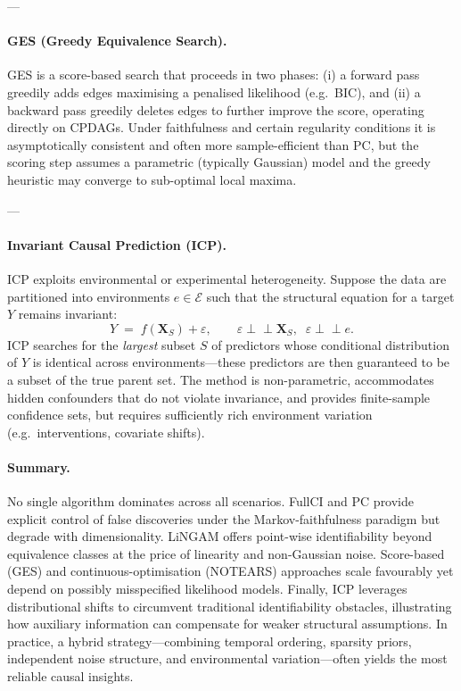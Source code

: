 \documentclass[14pt]{extarticle}
\begin{document}
	---
	
	\paragraph*{GES (Greedy Equivalence Search).}  
	GES is a score-based search that proceeds in two phases: (i) a forward pass greedily adds edges maximising a penalised likelihood (e.g.\ BIC), and (ii) a backward pass greedily deletes edges to further improve the score, operating directly on CPDAGs.  Under faithfulness and certain regularity conditions it is asymptotically consistent and often more sample-efficient than PC, but the scoring step assumes a parametric (typically Gaussian) model and the greedy heuristic may converge to sub-optimal local maxima.  
	
	---
	
	\paragraph*{Invariant Causal Prediction (ICP).}  
	ICP exploits environmental or experimental heterogeneity.  Suppose the data are partitioned into environments $e\in\mathcal E$ such that the structural equation for a target $Y$ remains invariant:
	$$
	Y \;=\; f(\mathbf X_{S}) + \varepsilon,\qquad
	\varepsilon\!\perp\!\!\!\perp\!\mathbf X_{S},\;\; \varepsilon\!\perp\!\!\!\perp\! e .
	$$
	ICP searches for the \emph{largest} subset $S$ of predictors whose conditional distribution of $Y$ is identical across environments—these predictors are then guaranteed to be a subset of the true parent set.  The method is non-parametric, accommodates hidden confounders that do not violate invariance, and provides finite-sample confidence sets, but requires sufficiently rich environment variation (e.g.\ interventions, covariate shifts).  
	
	\paragraph*{Summary.}
	No single algorithm dominates across all scenarios.  FullCI and PC provide explicit control of false discoveries under the Markov-faithfulness paradigm but degrade with dimensionality.  LiNGAM offers point-wise identifiability beyond equivalence classes at the price of linearity and non-Gaussian noise.  Score-based (GES) and continuous-optimisation (NOTEARS) approaches scale favourably yet depend on possibly misspecified likelihood models.  Finally, ICP leverages distributional shifts to circumvent traditional identifiability obstacles, illustrating how auxiliary information can compensate for weaker structural assumptions.  In practice, a hybrid strategy—combining temporal ordering, sparsity priors, independent noise structure, and environmental variation—often yields the most reliable causal insights.
	
\end{document}
